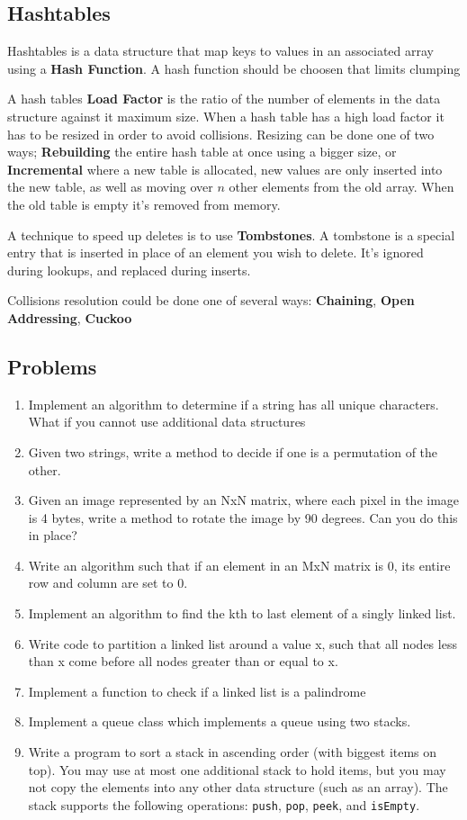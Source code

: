 \documentclass{article}
\begin{document}
\subsection{Hashtables}
Hashtables is a data structure that map keys to values in an associated array using a {\bf Hash Function}. A hash function should be choosen that limits clumping

A hash tables {\bf Load Factor} is the ratio of the number of elements in the data structure against it maximum size. When a hash table has a high load factor it has to be resized in order to avoid collisions. Resizing can be done one of two ways; {\bf Rebuilding} the entire hash table at once using a bigger size, or {\bf Incremental} where a new table is allocated, new values are only inserted into the new table, as well as moving over $n$ other elements from the old array. When the old table is empty it's removed from memory.

A technique to speed up deletes is to use {\bf Tombstones}. A tombstone is a special entry that is inserted in place of an element you wish to delete. It's ignored during lookups, and replaced during inserts.

Collisions resolution could be done one of several ways: {\bf Chaining}, {\bf Open Addressing}, {\bf Cuckoo}

\subsection{Problems}
	\begin{enumerate}
		\item Implement an algorithm to determine if a string has all unique characters. What if you cannot use additional data structures
		\item Given two strings, write a method to decide if one is a permutation of the other.
		\item Given an image represented by an NxN matrix, where each pixel in the image is 4 bytes, write a method to rotate the image by 90 degrees. Can you do this in place?
		\item Write an algorithm such that if an element in an MxN matrix is 0, its entire row and column are set to 0.
		\item Implement an algorithm to find the kth to last element of a singly linked list.
		\item Write code to partition a linked list around a value x, such that all nodes less than x come before all nodes greater than or equal to x.
		\item Implement a function to check if a linked list is a palindrome
		\item Implement a queue class which implements a queue using two stacks.
		\item Write a program to sort a stack in ascending order (with biggest items on top). You may use at most one additional stack to hold items, but you may not copy the elements into any other data structure (such as an array). The stack supports the following operations: \texttt{push}, \texttt{pop}, \texttt{peek}, and \texttt{isEmpty}.
	\end{enumerate}
\end{document}
